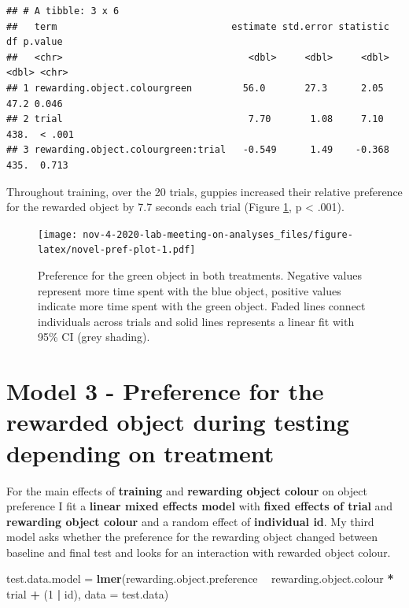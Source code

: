\documentclass[]{book}
\newenvironment{Shaded}{\begin{snugshade}}{\end{snugshade}}
\newcommand{\KeywordTok}[1]{\textcolor[rgb]{0.13,0.29,0.53}{\textbf{#1}}}
\newcommand{\DataTypeTok}[1]{\textcolor[rgb]{0.13,0.29,0.53}{#1}}
\newcommand{\DecValTok}[1]{\textcolor[rgb]{0.00,0.00,0.81}{#1}}
\newcommand{\StringTok}[1]{\textcolor[rgb]{0.31,0.60,0.02}{#1}}
\newcommand{\OperatorTok}[1]{\textcolor[rgb]{0.81,0.36,0.00}{\textbf{#1}}}
\newcommand{\NormalTok}[1]{#1}
\begin{document}
\begin{verbatim}
## # A tibble: 3 x 6
##   term                               estimate std.error statistic    df p.value
##   <chr>                                 <dbl>     <dbl>     <dbl> <dbl> <chr>  
## 1 rewarding.object.colourgreen         56.0       27.3      2.05   47.2 0.046  
## 2 trial                                 7.70       1.08     7.10  438.  < .001 
## 3 rewarding.object.colourgreen:trial   -0.549      1.49    -0.368 435.  0.713
\end{verbatim}

Throughout training, over the 20 trials, guppies increased their
relative preference for the rewarded object by 7.7 seconds each trial
(Figure \ref{fig:novel-pref-plot}, p \textless{} .001).

\begin{figure}
\centering
\texttt{[image: nov-4-2020-lab-meeting-on-analyses\_files/figure-latex/novel-pref-plot-1.pdf]}
\caption{\label{fig:novel-pref-plot}Preference for the green object in both
treatments. Negative values represent more time spent with the blue
object, positive values indicate more time spent with the green object.
Faded lines connect individuals across trials and solid lines represents
a linear fit with 95\% CI (grey shading).}
\end{figure}

\chapter{Model 3 - Preference for the rewarded object during testing
depending on
treatment}\label{model-3---preference-for-the-rewarded-object-during-testing-depending-on-treatment}

For the main effects of \textbf{training} and \textbf{rewarding object
colour} on object preference I fit a \textbf{linear mixed effects model}
with \textbf{fixed effects of trial} and \textbf{rewarding object
colour} and a random effect of \textbf{individual id}. My third model
asks whether the preference for the rewarding object changed between
baseline and final test and looks for an interaction with rewarded
object colour.

\begin{Shaded}
\begin{Highlighting}[]
\NormalTok{test.data.model =}\StringTok{ }
\StringTok{  }\KeywordTok{lmer}\NormalTok{(rewarding.object.preference }\OperatorTok{~}\StringTok{ }\NormalTok{rewarding.object.colour }\OperatorTok{*}\StringTok{ }\NormalTok{trial }\OperatorTok{+}\StringTok{ }\NormalTok{(}\DecValTok{1} \OperatorTok{|}\StringTok{ }\NormalTok{id),}
       \DataTypeTok{data =}\NormalTok{ test.data)}
\end{Highlighting}
\end{Shaded}
\end{document}
